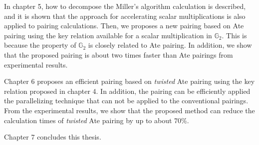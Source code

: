 In chapter 5, how to decompose the Miller's algorithm calculation is described, and it is shown that the approach for accelerating scalar multiplications is also applied to pairing calculations.
Then, we proposes a new pairing based on Ate pairing using the key relation available for a scalar multiplication in $\mathbb{G}_2$.
This is because the property of $\mathbb{G}_2$ is closely related to Ate pairing.
In addition, we show that the proposed pairing is about two times faster than Ate pairings from experimental results.   

Chapter 6 proposes an efficient pairing based on {\it twisted} Ate pairing using the key relation proposed in chapter 4.
In addition, the pairing can be efficiently applied the parallelizing technique that can not be applied to the conventional pairings.
From the experimental results, we show that the proposed method can reduce the calculation times of {\it twisted} Ate pairing by up to about 70\%. 

Chapter 7 concludes this thesis.